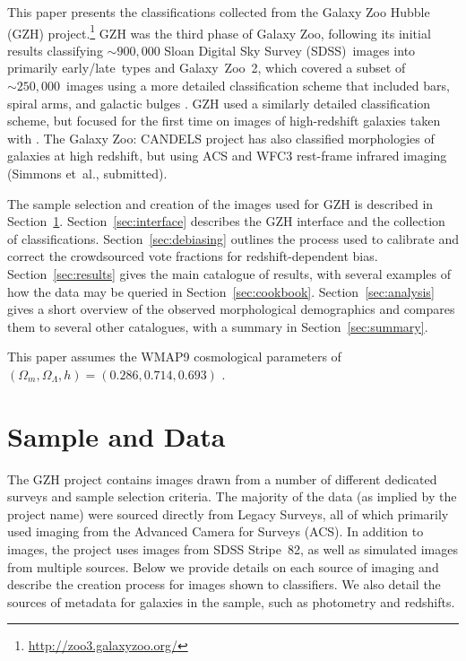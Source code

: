 \documentclass[a4paper,fleqn,usenatbib]{mnras}
\begin{document}
This paper presents the classifications collected from the Galaxy Zoo Hubble
(GZH) project.\footnote{\url{http://zoo3.galaxyzoo.org/}} GZH was the third
phase of Galaxy Zoo, following its initial results classifying
$\sim900,000$ Sloan Digital Sky Survey (SDSS)~images into primarily early/late~types \citep{lin11} and
Galaxy~Zoo~2, which covered a subset of $\sim250,000$~images using a more detailed
classification scheme that included bars, spiral arms, and galactic bulges
\citep{wil13}. GZH used a similarly detailed classification scheme, but focused
for the first time on images of high-redshift galaxies taken with \hst. The
Galaxy Zoo: CANDELS project has also classified morphologies of galaxies at
high redshift, but using ACS and WFC3 rest-frame infrared imaging (Simmons
et~al., submitted).

The sample selection and creation of the images used for GZH is described in
Section~\ref{sec:data}. Section~\ref{sec:interface} describes the GZH interface
and the collection of classifications. Section~\ref{sec:debiasing} outlines the
process used to calibrate and correct the crowdsourced vote fractions for
redshift-dependent bias. Section~\ref{sec:results} gives the main catalogue of
results, with several examples of how the data may be queried in
Section~\ref{sec:cookbook}. Section~\ref{sec:analysis} gives a short overview
of the observed morphological demographics and compares them to several other
catalogues, with a summary in Section~\ref{sec:summary}.

This paper assumes the WMAP9 cosmological parameters of
$(\Omega_m,\Omega_\Lambda,h)=(0.286,0.714,0.693)$ \citep{hin13}.

\section{Sample and Data}\label{sec:data}

The GZH project contains images drawn from a number of different dedicated
surveys and sample selection criteria. The majority of the data (as implied by
the project name) were sourced directly from \hst{} Legacy Surveys, all of which
primarily used imaging from the Advanced Camera for Surveys (ACS). In addition
to \hst{} images, the project uses images from SDSS Stripe~82, as well as
simulated \hst{} images from multiple sources. Below we provide details on each
source of imaging and describe the creation process for images shown to classifiers. 
We also detail the sources of metadata for galaxies in the sample, such as 
photometry and redshifts.
\end{document}
